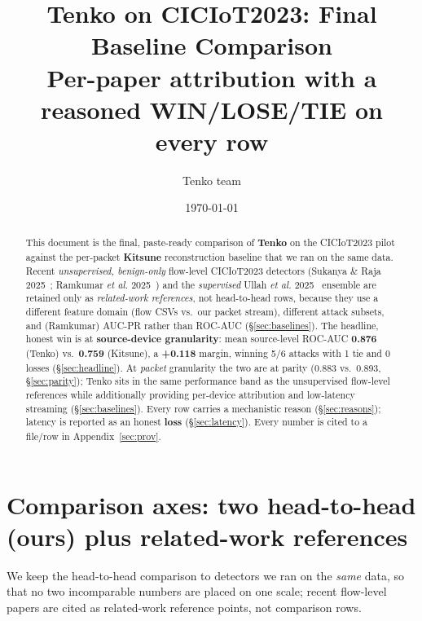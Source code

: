 \documentclass[11pt]{article}
\title{Tenko on CICIoT2023: Final Baseline Comparison\\
\large Per-paper attribution with a reasoned WIN/LOSE/TIE on every row}
\author{Tenko team}
\date{\today}
\begin{document}
\maketitle
\sloppy

\begin{abstract}
This document is the final, paste-ready comparison of \textbf{Tenko} on the CICIoT2023 pilot
against the per-packet \textbf{Kitsune} reconstruction baseline that we ran on the same data. Recent
\emph{unsupervised, benign-only} flow-level CICIoT2023 detectors (Sukanya \& Raja 2025~\cite{sukanya2025};
Ramkumar \emph{et al.} 2025~\cite{ramkumar2025}) and the \emph{supervised} Ullah \emph{et al.}
2025~\cite{ullah2025} ensemble are retained only as \emph{related-work references}, not head-to-head
rows, because they use a different feature domain (flow CSVs vs.\ our packet stream), different attack
subsets, and (Ramkumar) AUC-PR rather than ROC-AUC (\S\ref{sec:baselines}). The headline, honest win is
at \textbf{source-device granularity}: mean source-level ROC-AUC \textbf{0.876} (Tenko) vs.\
\textbf{0.759} (Kitsune), a \textbf{+0.118} margin, winning 5/6 attacks with 1 tie and 0 losses
(\S\ref{sec:headline}). At \emph{packet} granularity the two are at parity (0.883 vs.\ 0.893,
\S\ref{sec:parity}); Tenko sits in the same performance band as the unsupervised flow-level references
while additionally providing per-device attribution and low-latency streaming (\S\ref{sec:baselines}).
Every row carries a mechanistic reason (\S\ref{sec:reasons}); latency is reported as an honest
\textbf{loss} (\S\ref{sec:latency}). Every number is cited to a file/row in Appendix~\ref{sec:prov}.
\end{abstract}

\section{Comparison axes: two head-to-head (ours) plus related-work references}
\label{sec:axes}

We keep the head-to-head comparison to detectors we ran on the \emph{same} data, so that no two
incomparable numbers are placed on one scale; recent flow-level papers are cited as related-work
reference points, not comparison rows.
\end{document}
